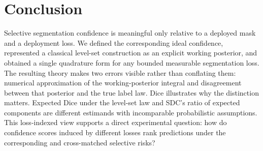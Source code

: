 \section{Conclusion}

Selective segmentation confidence is meaningful only relative to a deployed mask and
a deployment loss. We defined the corresponding ideal confidence, represented a
classical level-set construction as an explicit working posterior, and obtained a
single quadrature form for any bounded measurable segmentation loss. The resulting
theory makes two errors visible rather than conflating them: numerical approximation
of the working-posterior integral and disagreement between that posterior and the true
label law. Dice illustrates why the distinction matters. Expected Dice under the
level-set law and SDC's ratio of expected components are different estimands with
incomparable probabilistic assumptions. This loss-indexed view supports a direct
experimental question: how do confidence scores induced by different losses rank
predictions under the corresponding and cross-matched selective risks?
